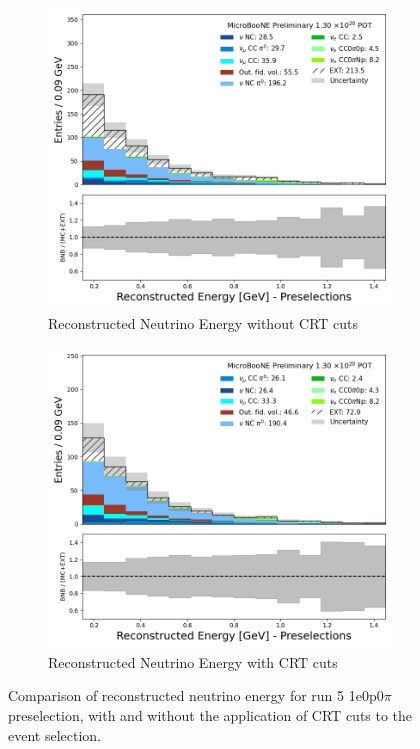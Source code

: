 \begin{figure}[H] \centering
    \begin{subfigure}[t]{0.45\linewidth}
        \includegraphics[width=\linewidth]{technote/EventSelections/FiguresCRT/run5_0p_presel.png}
        \caption{Reconstructed Neutrino Energy without CRT cuts}
    \end{subfigure}%
    \hspace{0.45cm}%
    \begin{subfigure}[t]{0.45\linewidth}
        \includegraphics[width=\linewidth]{technote/EventSelections/FiguresCRT/run5_0p_presel_crt.png}%
        \caption{Reconstructed Neutrino Energy with CRT cuts}
    \end{subfigure}%
    \caption{Comparison of reconstructed neutrino energy for run 5 1e0p0$\pi$ preselection, with and without the application of CRT cuts to the event selection.}
    \label{fig:1e0p_preselection}
\end{figure}

